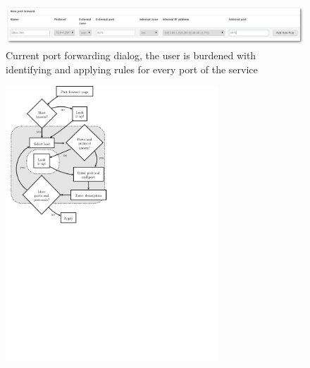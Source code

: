 \documentclass[a4paper,11pt,makeidx]{kth-bcs}
\begin{document}
\begin{figure}[h]
   \centering
   \includegraphics[width=17cm]{ss-before-shadow}
   \caption{Current port forwarding dialog, the user is burdened with identifying and applying rules for every port of the service}
   \label{fig:before}
\end{figure}

\begin{figure}[h] %
   \begin{minipage}[b]{0.45\linewidth}
      \centering
      \includegraphics[trim = 4mm 140mm 90mm 0mm, clip, width=8cm,natwidth=2.570in,natheight=0.580in]{before}
   \end{minipage}
   \begin{minipage}[b]{0.45\linewidth}
      \centering

\end{minipage}
\end{figure}
\end{document}
